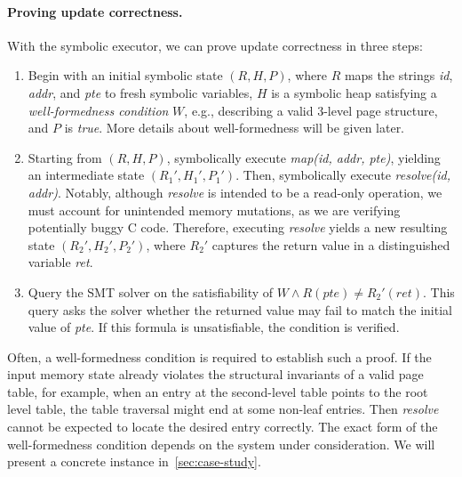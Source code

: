 \paragraph{Proving update correctness.}
With the symbolic executor, we can prove update correctness in three steps:
\begin{enumerate}[leftmargin=*]
  \item Begin with an initial symbolic state \((R, H, P)\), where \(R\) maps the strings \textit{id}, \textit{addr}, and \textit{pte} to fresh symbolic variables, \(H\) is a symbolic heap satisfying a \emph{well-formedness condition} $W$, e.g., describing a valid 3-level page structure, and \(P\) is \textit{true}. More details about well-formedness will be given later.
  \item Starting from \((R, H, P)\), symbolically execute \textit{map(id, addr, pte)}, yielding an intermediate state \((R_1', H_1', P_1')\). Then, symbolically execute \textit{resolve(id, addr)}. Notably, although \textit{resolve} is intended to be a read-only operation, we must account for unintended memory mutations, as we are verifying potentially buggy C code. Therefore, executing \textit{resolve} yields a new resulting state \((R_2', H_2', P_2')\), where \(R_2'\) captures the return value in a distinguished variable \textit{ret}.
  \item Query the SMT solver on the satisfiability of \(W \wedge R(\textit{pte}) \neq R_2'(\textit{ret})\). This query asks the solver whether the returned value may fail to match the initial value of \textit{pte}. If this formula is unsatisfiable, the condition is verified.
\end{enumerate}

Often, a well-formedness condition is required to establish such a proof. If the input memory state already violates the structural invariants of a valid page table, for example, when an entry at the second-level table points to the root level table, the table traversal might end at some non-leaf entries. Then \textit{resolve} cannot be expected to locate the desired entry correctly. The exact form of the well-formedness condition depends on the system under consideration. We will present a concrete instance in~\autoref{sec:case-study}.

